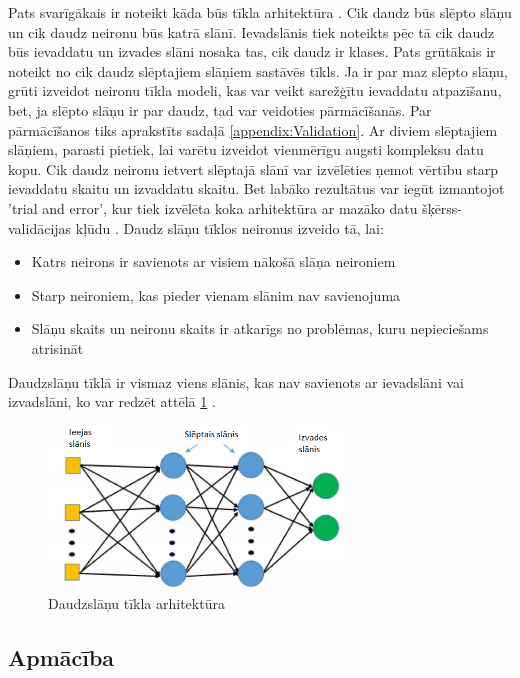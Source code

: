 \documentclass[12pt,paper=A4]{report}
\begin{document}
Pats svarīgākais ir noteikt kāda būs tīkla arhitektūra
. Cik daudz būs slēpto slāņu un cik daudz neironu 
būs katrā slānī. Ievadslānis tiek noteikts pēc tā
cik daudz būs ievaddatu un izvades slāni nosaka tas, 
cik daudz ir klases. Pats grūtākais ir noteikt no cik daudz slēptajiem slāņiem sastāvēs tīkls. Ja ir par maz slēpto slāņu, grūti izveidot neironu tīkla modeli, kas var veikt sarežģītu ievaddatu atpazīšanu, bet, ja slēpto slāņu ir par daudz, tad var veidoties pārmācīšanās. Par pārmācīšanos tiks aprakstīts sadaļā \ref{appendix:Validation}. Ar diviem slēptajiem slāņiem, parasti 
pietiek, lai varētu izveidot vienmērīgu augsti 
kompleksu datu kopu.
Cik daudz neironu ietvert slēptajā slānī var 
izvēlēties ņemot vērtību starp ievaddatu skaitu 
un izvaddatu skaitu. Bet labāko rezultātus var 
iegūt izmantojot 'trial and error', kur tiek 
izvēlēta koka arhitektūra ar mazāko datu 
šķērss-validācijas kļūdu \cite{layers}. Daudz slāņu tīklos neironus 
izveido tā, lai:
\begin{itemize}

\item Katrs neirons ir savienots ar visiem nākošā slāņa neironiem
\item Starp neironiem, kas pieder vienam slānim nav savienojuma
\item Slāņu skaits un neironu skaits ir atkarīgs no problēmas, kuru nepieciešams atrisināt

\end{itemize}

Daudzslāņu tīklā ir vismaz viens slānis, kas nav savienots ar ievadslāni vai izvadslāni, ko var redzēt attēlā \ref{neiro2} \cite{dtw18}. 

\begin{figure}[H] \centering
\includegraphics[width=0.70\textwidth]{mnn} 
\caption{Daudzslāņu  tīkla arhitektūra\cite{dtw18}}  \label{neiro2} 
\end{figure}

\subsection{Apmācība}
\end{document}
